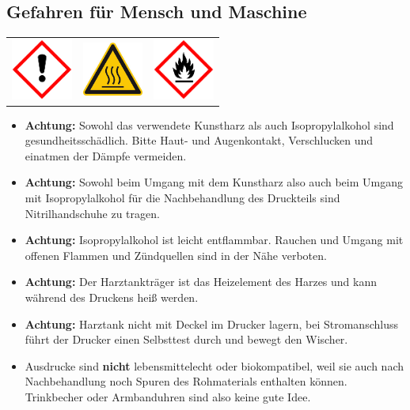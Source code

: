 \documentclass{\basedir/fablab-document}
\begin{document}
\subsection{Gefahren für Mensch und Maschine}
\begin{table}[h]
	\centering
	\begin{tabular}{ccc}
		
		\includegraphics[width=2cm]{bilder/GHSa.png}  &
		\includegraphics[width=2cm]{bilder/GHShs.jpg}  & \includegraphics[width=2cm]{bilder/GHSf.png}
	\end{tabular}
\end{table}

\begin{itemize}
	\item \textbf{Achtung:} Sowohl das verwendete Kunstharz als auch Isopropylalkohol sind gesundheitsschädlich. Bitte Haut- und Augenkontakt, Verschlucken und einatmen der Dämpfe vermeiden.
	\item \textbf{Achtung:} Sowohl beim Umgang mit dem Kunstharz also auch beim Umgang mit Isopropylalkohol für die Nachbehandlung des Druckteils sind Nitrilhandschuhe zu tragen. 
	\item \textbf{Achtung:} Isopropylalkohol ist leicht entflammbar. Rauchen und Umgang mit offenen Flammen und Zündquellen sind in der Nähe verboten. 
	\item \textbf{Achtung:} Der Harztankträger ist das Heizelement des Harzes und kann während des Druckens heiß werden.
	\item \textbf{Achtung:} Harztank nicht mit Deckel im Drucker lagern, bei Stromanschluss führt der Drucker einen Selbsttest durch und bewegt den Wischer.
	\item Ausdrucke sind \textbf{nicht} lebensmittelecht oder biokompatibel, weil sie  auch nach Nachbehandlung noch Spuren des Rohmaterials enthalten können. Trinkbecher oder Armbanduhren sind also keine gute Idee.
\end{itemize}
\end{document}
